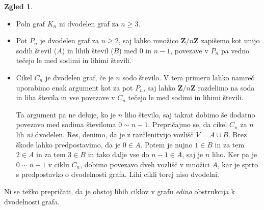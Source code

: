\documentclass[11pt]{book}
\def\ZZ{\mathbf{Z}}
\theoremstyle{definition}
\theoremstyle{zgled}
\newtheorem*{zgled}{Zgled}
\theoremstyle{odprtproblem}
\theoremstyle{domacanaloga}
\theoremstyle{izrek}
\begin{document}
\begin{zgled} \leavevmode
    \begin{itemize}
        \item Poln graf $K_n$ ni dvodelen graf za $n \geq 3$.
        \item Pot $P_n$ je dvodelen graf za $n \geq 2$, saj lahko množico $\ZZ/n\ZZ$ zapišemo kot unijo sodih števil ($A$) in lihih števil ($B$) med $0$ in $n-1$, povezave v $P_n$ pa vedno tečejo le med sodimi in lihimi števili.
        \item Cikel $C_n$ je dvodelen graf, če je $n$ sodo število. V tem primeru lahko namreč uporabimo enak argument kot za pot $P_n$, saj lahko $\ZZ/n\ZZ$ razdelimo na soda in liha števila in vse povezave v $C_n$ tečejo le med sodimi in lihimi števili. 
        
        Ta argument pa ne deluje, ko je $n$ liho število, saj takrat dobimo še dodatno povezavo med sodima številoma $0 \sim n-1$. Prepričajmo se, da cikel $C_n$ za $n$ lih \emph{ni} dvodelen. Res, denimo, da je z razčlenitvijo vozlišč $V = A \cup B$. Brez škode lahko predpostavimo, da je $0 \in A$. Potem je nujno $1 \in B$ in za tem $2 \in A$ in za tem $3 \in B$ in tako dalje vse do $n-1 \in A$, saj je $n$ liho. Ker pa je $0 \sim n-1$ v ciklu $C_n$, dobimo povezavo dveh vozlišč v množici $A$, kar je sprto s predpostavko o dvodelnosti grafa. Lihi cikli torej niso dvodelni.
    \end{itemize}
\end{zgled}

Ni se težko prepričati, da je obstoj lihih ciklov v grafu \emph{edina} obstrukcija k dvodelnosti grafa.
\end{document}
